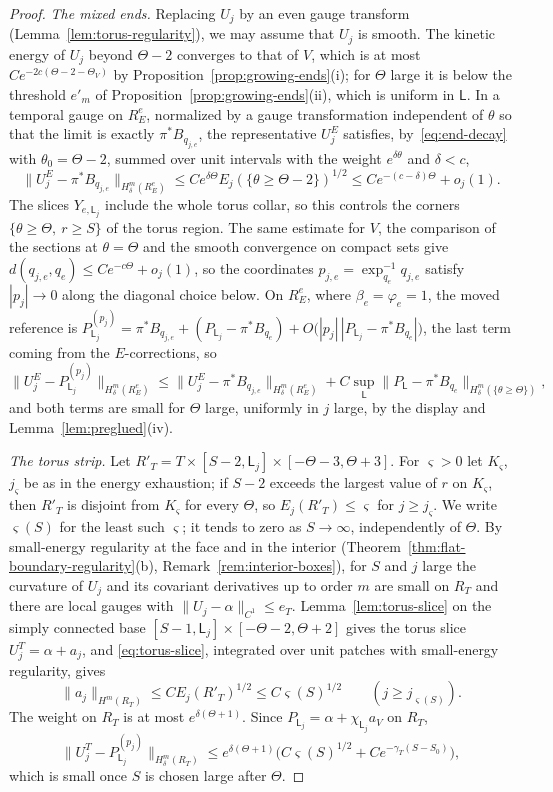 \documentclass[11pt]{amsart}
\theoremstyle{definition}
\theoremstyle{remark}
\theoremstyle{plain}
\numberwithin{equation}{section}
\begin{document}
\begin{proof}
\emph{The mixed ends.} Replacing $U_j$ by an even gauge transform
(Lemma~\ref{lem:torus-regularity}), we may assume that $U_j$ is smooth. The kinetic energy of
$U_j$ beyond $\Theta-2$ converges to that of $V$, which is at most $Ce^{-2c(\Theta-2-\Theta_V)}$ by
Proposition~\ref{prop:growing-ends}(i); for $\Theta$ large it is below the threshold $e'_m$ of
Proposition~\ref{prop:growing-ends}(ii), which is uniform in $\mathsf L$. In a temporal gauge on
$R_E^e$, normalized by a gauge transformation independent of $\theta$ so that the limit is
exactly $\pi^*B_{q_{j,e}}$, the representative $U_j^E$ satisfies, by~\eqref{eq:end-decay} with
$\theta_0=\Theta-2$, summed over unit intervals with the weight $e^{\delta\theta}$ and $\delta<c$,
\[
\|U^E_j-\pi^*B_{q_{j,e}}\|_{H^m_\delta(R^e_E)}\le Ce^{\delta\Theta}E_j(\{\theta\ge\Theta-2\})^{1/2}
\le Ce^{-(c-\delta)\Theta}+o_j(1).
\]
The slices $Y_{e,\mathsf L_j}$ include the whole torus collar, so this controls the corners
$\{\theta\ge\Theta,\ r\ge S\}$ of the torus region. The same estimate for $V$, the
comparison of the sections at $\theta=\Theta$ and the smooth convergence on compact sets
give $d(q_{j,e},q_e)\le Ce^{-c\Theta}+o_j(1)$, so the coordinates
$p_{j,e}=\exp_{q_e}^{-1}q_{j,e}$ satisfy $|p_j|\to0$ along the diagonal choice below.
On $R^e_E$, where $\beta_e=\varphi_e=1$, the moved reference is
$P^{(p_j)}_{\mathsf L_j}=\pi^*B_{q_{j,e}}+(P_{\mathsf L_j}-\pi^*B_{q_e})+O\bigl(|p_j|\,|P_{\mathsf L_j}-\pi^*B_{q_e}|\bigr)$, the last
term coming from the $E$-corrections, so
\[
\|U^E_j-P^{(p_j)}_{\mathsf L_j}\|_{H^m_\delta(R^e_E)}\le\|U^E_j-\pi^*B_{q_{j,e}}\|_{H^m_\delta(R^e_E)}
+C\sup_\mathsf L\|P_\mathsf L-\pi^*B_{q_e}\|_{H^m_\delta(\{\theta\ge\Theta\})},
\]
and both terms are small for $\Theta$ large, uniformly in $j$ large, by the display and
Lemma~\ref{lem:preglued}(iv).

\emph{The torus strip.} Let $R'_T=T\times[S-2,\mathsf L_j]\times[-\Theta-3,\Theta+3]$. For $\varsigma>0$ let
$K_\varsigma$, $j_\varsigma$ be as in the energy exhaustion; if $S-2$ exceeds the largest value of
$r$ on $K_\varsigma$, then $R'_T$ is disjoint from $K_\varsigma$ for every $\Theta$, so
$E_j(R'_T)\le\varsigma$ for $j\ge j_\varsigma$. We write $\varsigma(S)$ for the least such $\varsigma$; it tends to
zero as $S\to\infty$, independently of $\Theta$. By small-energy regularity at the face and in
the interior (Theorem~\ref{thm:flat-boundary-regularity}(b),
Remark~\ref{rem:interior-boxes}), for $S$ and $j$ large the curvature of $U_j$ and its
covariant derivatives up to order $m$ are small on $R_T$ and there are local gauges
with $\|U_j-\alpha\|_{C^1}\le e_T$. Lemma~\ref{lem:torus-slice} on the simply connected base
$[S-1,\mathsf L_j]\times[-\Theta-2,\Theta+2]$ gives the torus slice $U^T_j=\alpha+a_j$, and
\eqref{eq:torus-slice}, integrated over unit patches with small-energy regularity, gives
\[
\|a_j\|_{H^m(R_T)}\le CE_j(R'_T)^{1/2}\le C\varsigma(S)^{1/2}\qquad(j\ge j_{\varsigma(S)}).
\]
The weight on $R_T$ is at most $e^{\delta(\Theta+1)}$. Since $P_{\mathsf L_j}=\alpha+\chi_{\mathsf L_j}a_V$ on $R_T$,
\[
\|U^T_j-P^{(p_j)}_{\mathsf L_j}\|_{H^m_\delta(R_T)}\le e^{\delta(\Theta+1)}\bigl(C\varsigma(S)^{1/2}
+Ce^{-\gamma_T(S-S_0)}\bigr),
\]
which is small once $S$ is chosen large after $\Theta$.


\end{proof}
\end{document}
